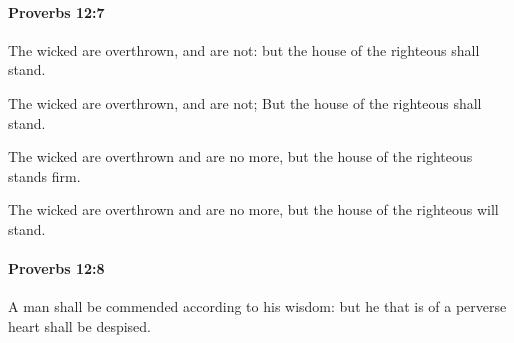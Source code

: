 		\paragraph{Proverbs 12:7} %
			\label{PROVERBS-12-7}

			The wicked are overthrown, and are not: but the house of the righteous shall stand.

			\begin{versebox}
					\item[BHS] 
					\item[ASV] The wicked are overthrown, and are not; But the house of the righteous shall stand.
					\item[NIV] The wicked are overthrown and are no more, but the house of the righteous stands firm.
					\item[NRSV] The wicked are overthrown and are no more, but the house of the righteous will stand.
			\end{versebox}

		\paragraph{Proverbs 12:8} %
			\label{PROVERBS-12-8}

			A man shall be commended according to his wisdom: but he that is of a perverse heart shall be despised.

